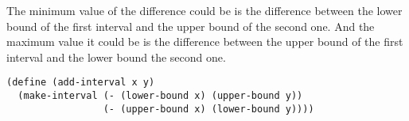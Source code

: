 \documentclass[a4paper,12pt]{article}
\begin{document}
The minimum value of the difference could be is the difference between
the lower bound of the first interval and the upper bound of the
second one.  And the maximum value it could be is the difference
between the upper bound of the first interval and the lower bound the
second one.
\begin{lstlisting}
(define (add-interval x y)
  (make-interval (- (lower-bound x) (upper-bound y))
                 (- (upper-bound x) (lower-bound y))))
\end{lstlisting}
\end{document}
